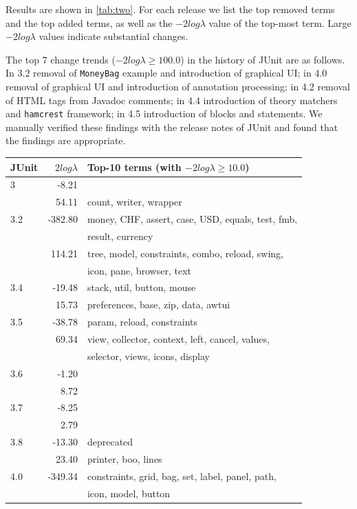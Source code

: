 Results are shown in \autoref{tab:two}. For each release we list the top removed terms and the top added terms, as well as the $-2log\lambda$ value of the top-most term. Large $-2log\lambda$ values indicate substantial changes.

The top 7 change trends (\ie $-2log\lambda \geqslant 100.0$) in the history of JUnit are as follows. In 3.2 removal of \verb$MoneyBag$ example and introduction of graphical UI; in 4.0 removal of graphical UI and introduction of annotation processing; in 4.2 removal of HTML tags from Javadoc comments; in 4.4 introduction of theory matchers and \verb$hamcrest$ framework; in 4.5 introduction of blocks and statements. We manually verified these findings with the release notes of JUnit and found that the findings are appropriate.
 
\begin{table}
{\scriptsize \begin{center}
\begin{tabular}{lrl}
\textbf{JUnit} & $2log\lambda$ & \textbf{Top-10 terms (with $-2log\lambda \geqslant10.0$)} \\
\hline
3 & -8.21 &  \\
~ & 54.11 & count, writer, wrapper \\
\hline
3.2 & -382.80 & money, CHF, assert, case, USD, equals, test, fmb,\\~&~& result, currency \\
~ & 114.21 & tree, model, constraints, combo, reload, swing,\\~&~& icon, pane, browser, text \\
\hline
3.4 & -19.48 & stack, util, button, mouse \\
~ & 15.73 & preferences, base, zip, data, awtui \\
\hline
3.5 & -38.78 & param, reload, constraints \\
~ & 69.34 & view, collector, context, left, cancel, values,\\~&~& selector, views, icons, display \\
\hline
3.6 & -1.20 &  \\
~ & 8.72 &  \\
\hline
3.7 & -8.25 &  \\
~ & 2.79 &  \\
\hline
3.8 & -13.30 & deprecated \\
~ & 23.40 & printer, boo, lines \\
\hline
4.0 & -349.34 & constraints, grid, bag, set, label, panel, path,\\~&~& icon, model, button \\

\end{tabular}
\end{center}}
\end{table}
